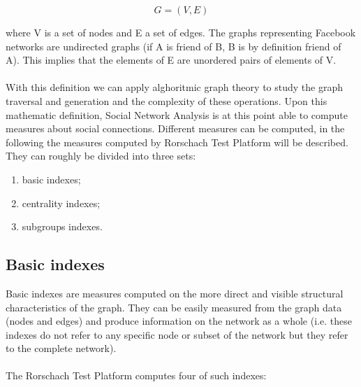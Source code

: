 \begin{equation}
G = (V, E)
\label{eq:graph}
\end{equation}

where V is a set of nodes and E a set of edges.
The graphs representing Facebook networks are undirected graphs (if A is friend of B, B is by deﬁnition friend of A).
This implies that the elements of E are unordered pairs of elements of V.\\
\\
With this deﬁnition we can apply alghoritmic graph theory to study the graph traversal and generation and the complexity of these operations.
Upon this mathematic deﬁnition, Social Network Analysis is at this point able to compute measures about social connections.
Different measures can be computed, in the following the measures computed by Rorschach Test Platform will be described.
They can roughly be divided into three sets:
\begin{enumerate}
\item basic indexes;
\item centrality indexes;
\item subgroups indexes.
\end{enumerate}

\subsection{Basic indexes}
Basic indexes are measures computed on the more direct and visible structural characteristics of the graph.
They can be easily measured from the graph data (nodes and edges) and produce information on the network as a whole
(i.e. these indexes do not refer to any speciﬁc node or subset of the network but they refer to the complete network).\\
\\
The Rorschach Test Platform computes four of such indexes:

